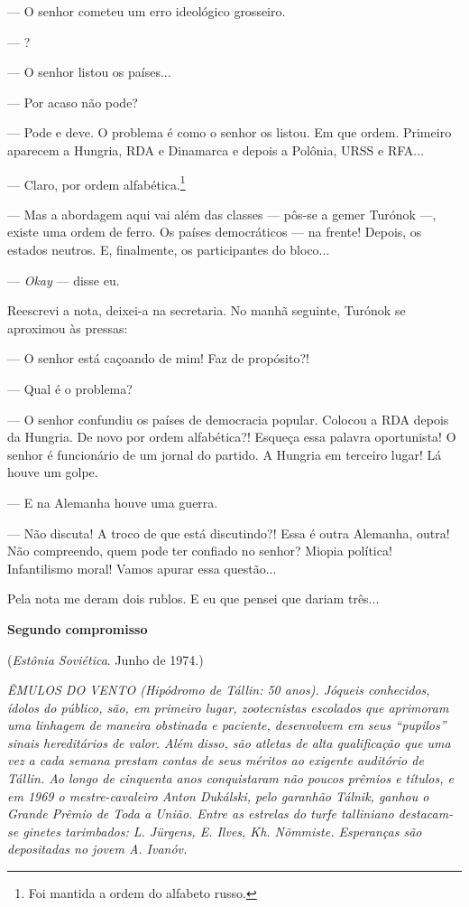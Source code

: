 --- O senhor cometeu um erro ideológico grosseiro.

--- ?

--- O senhor listou os países...

--- Por acaso não pode?

--- Pode e deve. O problema é como o senhor os listou. Em que ordem.
Primeiro aparecem a Hungria, RDA e Dinamarca e depois a Polônia, URSS e
RFA...

--- Claro, por ordem alfabética.\footnote{Foi mantida a ordem do
  alfabeto russo.}

--- Mas a abordagem aqui vai além das classes --- pôs-se a gemer Turónok
---, existe uma ordem de ferro. Os países democráticos --- na frente!
Depois, os estados neutros. E, finalmente, os participantes do bloco...

--- \emph{Okay} --- disse eu.

Reescrevi a nota, deixei-a na secretaria. No manhã seguinte, Turónok se
aproximou às pressas:

--- O senhor está caçoando de mim! Faz de propósito?!

--- Qual é o problema?

--- O senhor confundiu os países de democracia popular. Colocou a RDA
depois da Hungria. De novo por ordem alfabética?! Esqueça essa palavra
oportunista! O senhor é funcionário de um jornal do partido. A Hungria
em terceiro lugar! Lá houve um golpe.

--- E na Alemanha houve uma guerra.

--- Não discuta! A troco de que está discutindo?! Essa é outra Alemanha,
outra! Não compreendo, quem pode ter confiado no senhor? Miopia
política! Infantilismo moral! Vamos apurar essa questão...

Pela nota me deram dois rublos. E eu que pensei que dariam três...

\textbf{Segundo compromisso}

(\emph{Estônia Soviética}. Junho de 1974.)

\emph{ÊMULOS DO VENTO (Hipódromo de Tállin: 50 anos). Jóqueis
conhecidos, ídolos do público, são, em primeiro lugar, zootecnistas
escolados que aprimoram uma linhagem de maneira obstinada e paciente,
desenvolvem em seus ``pupilos'' sinais hereditários de valor. Além
disso, são atletas de alta qualificação que uma vez a cada semana
prestam contas de seus méritos ao exigente auditório de Tállin. Ao longo
de cinquenta anos conquistaram não poucos prêmios e títulos, e em 1969 o
mestre-cavaleiro Anton Dukálski, pelo garanhão Tálnik, ganhou o Grande
Prêmio de Toda a União. Entre as estrelas do turfe talliniano
destacam-se ginetes tarimbados: L. Jürgens, E. Ilves, Kh. Nõmmiste.
Esperanças são depositadas no jovem A. Ivanóv.}

